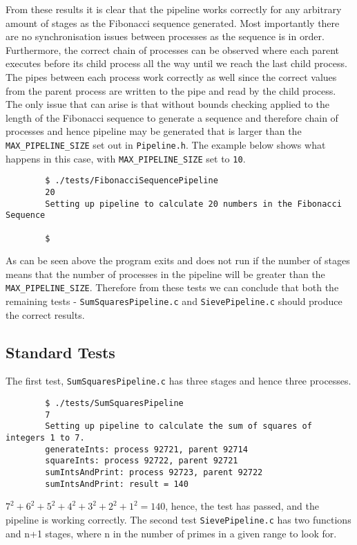 \documentclass{article}
\begin{document}
    \noindent From these results it is clear that the pipeline works correctly for any arbitrary amount of stages as the Fibonacci sequence generated.
    Most importantly there are no synchronisation issues between processes as the sequence is in order.
    Furthermore, the correct chain of processes can be observed where each parent executes before its child process all the way until we reach the last child process.
    The pipes between each process work correctly as well since the correct values from the parent process are written to the pipe and read by the child process.
    The only issue that can arise is that without bounds checking applied to the length of the Fibonacci sequence to generate a sequence and therefore chain of processes and hence pipeline may be generated that is larger than the \verb+MAX_PIPELINE_SIZE+ set out in \verb+Pipeline.h+.
    The example below shows what happens in this case, with \verb+MAX_PIPELINE_SIZE+ set to \verb+10+.

        \begin{verbatim}
        $ ./tests/FibonacciSequencePipeline
        20
        Setting up pipeline to calculate 20 numbers in the Fibonacci Sequence

        $
        \end{verbatim}

    \noindent As can be seen above the program exits and does not run if the number of stages means that the number of processes in the pipeline will be greater than the \verb+MAX_PIPELINE_SIZE+.
    Therefore from these tests we can conclude that both the remaining tests - \verb+SumSquaresPipeline.c+ and \verb+SievePipeline.c+ should produce the correct results.
    
    \subsection{Standard Tests}
    The first test, \verb+SumSquaresPipeline.c+ has three stages and hence three processes.

        \begin{verbatim}
        $ ./tests/SumSquaresPipeline
        7
        Setting up pipeline to calculate the sum of squares of integers 1 to 7.
        generateInts: process 92721, parent 92714
        squareInts: process 92722, parent 92721
        sumIntsAndPrint: process 92723, parent 92722
        sumIntsAndPrint: result = 140
        \end{verbatim}

    \noindent $7^2 + 6^2 + 5^2 + 4^2 + 3^2 + 2^2 + 1^2 = 140$, hence, the test has passed, and the pipeline is working correctly.
    The second test \verb+SievePipeline.c+ has two functions and n+1 stages, where n in the number of primes in a given range to look for.
\end{document}
